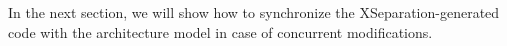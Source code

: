 In the next section, we will show how to synchronize the XSeparation-generated code with the architecture model in case of concurrent modifications. 



	

\begin{comment}{1.05\columnwidth}
	\begin{lstlisting}[language=C++, caption=A segment of C++ front-end code, label=lst:effect-segment,frame=f]
	void method1(int p1, int p2) {
	//method1 body
	}
	void effect1(int p1, int p2) {
	//effect1 body
	}
	void effect2(Sig& s) {
	//effect2 body
	}
	\end{lstlisting}
\end{comment}





